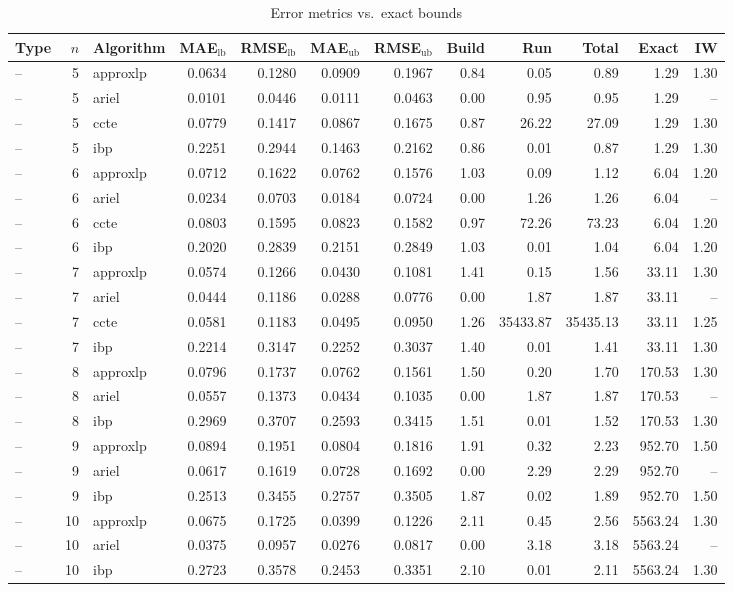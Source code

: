 \begin{table}[ht]
\centering
\scriptsize
\caption{Error metrics vs.\ exact bounds}
\begin{tabular}{lrlrrrrrrrrr}
\toprule
Type & $n$ & Algorithm & MAE$_{\text{lb}}$ & RMSE$_{\text{lb}}$ & MAE$_{\text{ub}}$ & RMSE$_{\text{ub}}$ & Build & Run & Total & Exact & IW \\
\midrule
-- & 5 & approxlp & 0.0634 & 0.1280 & 0.0909 & 0.1967 & 0.84 & 0.05 & 0.89 & 1.29 & 1.30 \\
-- & 5 & ariel & 0.0101 & 0.0446 & 0.0111 & 0.0463 & 0.00 & 0.95 & 0.95 & 1.29 & -- \\
-- & 5 & ccte & 0.0779 & 0.1417 & 0.0867 & 0.1675 & 0.87 & 26.22 & 27.09 & 1.29 & 1.30 \\
-- & 5 & ibp & 0.2251 & 0.2944 & 0.1463 & 0.2162 & 0.86 & 0.01 & 0.87 & 1.29 & 1.30 \\
-- & 6 & approxlp & 0.0712 & 0.1622 & 0.0762 & 0.1576 & 1.03 & 0.09 & 1.12 & 6.04 & 1.20 \\
-- & 6 & ariel & 0.0234 & 0.0703 & 0.0184 & 0.0724 & 0.00 & 1.26 & 1.26 & 6.04 & -- \\
-- & 6 & ccte & 0.0803 & 0.1595 & 0.0823 & 0.1582 & 0.97 & 72.26 & 73.23 & 6.04 & 1.20 \\
-- & 6 & ibp & 0.2020 & 0.2839 & 0.2151 & 0.2849 & 1.03 & 0.01 & 1.04 & 6.04 & 1.20 \\
-- & 7 & approxlp & 0.0574 & 0.1266 & 0.0430 & 0.1081 & 1.41 & 0.15 & 1.56 & 33.11 & 1.30 \\
-- & 7 & ariel & 0.0444 & 0.1186 & 0.0288 & 0.0776 & 0.00 & 1.87 & 1.87 & 33.11 & -- \\
-- & 7 & ccte & 0.0581 & 0.1183 & 0.0495 & 0.0950 & 1.26 & 35433.87 & 35435.13 & 33.11 & 1.25 \\
-- & 7 & ibp & 0.2214 & 0.3147 & 0.2252 & 0.3037 & 1.40 & 0.01 & 1.41 & 33.11 & 1.30 \\
-- & 8 & approxlp & 0.0796 & 0.1737 & 0.0762 & 0.1561 & 1.50 & 0.20 & 1.70 & 170.53 & 1.30 \\
-- & 8 & ariel & 0.0557 & 0.1373 & 0.0434 & 0.1035 & 0.00 & 1.87 & 1.87 & 170.53 & -- \\
-- & 8 & ibp & 0.2969 & 0.3707 & 0.2593 & 0.3415 & 1.51 & 0.01 & 1.52 & 170.53 & 1.30 \\
-- & 9 & approxlp & 0.0894 & 0.1951 & 0.0804 & 0.1816 & 1.91 & 0.32 & 2.23 & 952.70 & 1.50 \\
-- & 9 & ariel & 0.0617 & 0.1619 & 0.0728 & 0.1692 & 0.00 & 2.29 & 2.29 & 952.70 & -- \\
-- & 9 & ibp & 0.2513 & 0.3455 & 0.2757 & 0.3505 & 1.87 & 0.02 & 1.89 & 952.70 & 1.50 \\
-- & 10 & approxlp & 0.0675 & 0.1725 & 0.0399 & 0.1226 & 2.11 & 0.45 & 2.56 & 5563.24 & 1.30 \\
-- & 10 & ariel & 0.0375 & 0.0957 & 0.0276 & 0.0817 & 0.00 & 3.18 & 3.18 & 5563.24 & -- \\
-- & 10 & ibp & 0.2723 & 0.3578 & 0.2453 & 0.3351 & 2.10 & 0.01 & 2.11 & 5563.24 & 1.30 \\
\bottomrule
\end{tabular}
\end{table}

